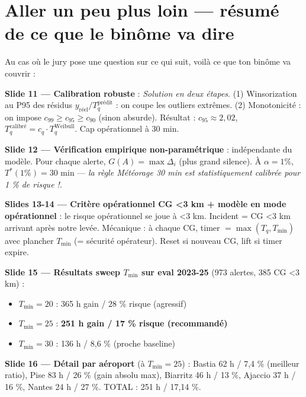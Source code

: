 \documentclass[11pt,a4paper]{article}
\begin{document}
\section*{Aller un peu plus loin — résumé de ce que le binôme va dire}

\begin{tcolorbox}[colback=blue!4,colframe=blue!50!black,title=\textbf{Aperçu des slides 11-20 (pour préparer la transition)}]

Au cas où le jury pose une question sur ce qui suit, voilà ce que ton binôme va couvrir :

\textbf{Slide 11 — Calibration robuste} :
\emph{Solution en deux étapes}. (1) Winsorization au P95 des résidus $y_{\text{réel}} / T_q^{\text{prédit}}$ :
on coupe les outliers extrêmes. (2) Monotonicité : on impose $c_{99} \geq c_{95} \geq c_{90}$ (sinon
absurde). Résultat : $c_{95} \approx 2{,}02$, $T_q^{\text{calibré}} = c_q \cdot T_q^{\text{Weibull}}$.
Cap opérationnel à 30 min.

\textbf{Slide 12 — Vérification empirique non-paramétrique} :
indépendante du modèle. Pour chaque alerte, $G(A) = \max \Delta_i$ (plus grand silence). À
$\alpha = 1 \%$, $T^*(1\%) = 30$ min — \emph{la règle Météorage 30 min est statistiquement
calibrée pour 1 \% de risque !}.

\textbf{Slides 13-14 — Critère opérationnel CG <3 km + modèle en mode opérationnel} :
le risque opérationnel se joue à <3 km. Incident = CG <3 km arrivant après notre levée.
Mécanique : à chaque CG, timer $= \max(T_q, T_{\min})$ avec plancher $T_{\min}$ (= sécurité
opérateur). Reset si nouveau CG, lift si timer expire.

\textbf{Slide 15 — Résultats sweep $T_{\min}$ sur eval 2023-25} (973 alertes, 385 CG <3 km) :
\begin{itemize}[topsep=2pt]
    \item $T_{\min} = 20$ : 365 h gain / 28 \% risque (agressif)
    \item $T_{\min} = 25$ : \textbf{251 h gain / 17 \% risque (recommandé)}
    \item $T_{\min} = 30$ : 136 h / 8,6 \% (proche baseline)
\end{itemize}

\textbf{Slide 16 — Détail par aéroport} (à $T_{\min} = 25$) : Bastia 62 h / 7,4 \% (meilleur
ratio), Pise 83 h / 26 \% (gain absolu max), Biarritz 46 h / 13 \%, Ajaccio 37 h / 16 \%,
Nantes 24 h / 27 \%. TOTAL : 251 h / 17,14 \%.


\end{tcolorbox}
\end{document}
